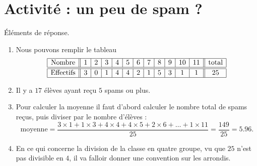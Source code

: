 

\setcounter{section}{-1}
\section{Activité : un peu de spam ?}



Éléments de réponse.

\begin{enumerate}
    \item
Nous pouvons remplir le tableau
\begin{equation*}
    \begin{array}[]{|c||c|c|c|c|c|c|c|c|c|c|c|| c |}
        \hline
        \text{Nombre}&1&2&3&4&5&6&7&8&9&10&11&\text{total}\\
        \hline\hline
        \text{Effectifs}&3&0&1&4&4&2&1&5&3&1&1&25\\
        \hline
    \end{array}
\end{equation*}
\item
Il y a \( 17\) élèves ayant reçu \( 5\) spams ou plus.
     \item
         Pour calculer la moyenne il faut d'abord calculer le nombre total de spams reçus, puis diviser par le nombre d'élèves :
         \begin{equation}
             \text{moyenne}=\frac{ 3\times 1+1\times 3+4\times 4+4\times 5+2\times 6+\ldots+1\times 11 }{ 25 }=\frac{ 149 }{ 25 }=5.96.            
         \end{equation}
     \item
         En ce qui concerne la division de la classe en quatre groupe, vu que \( 25\) n'est pas divisible en \( 4\), il va falloir donner une convention sur les arrondis.
\end{enumerate}

